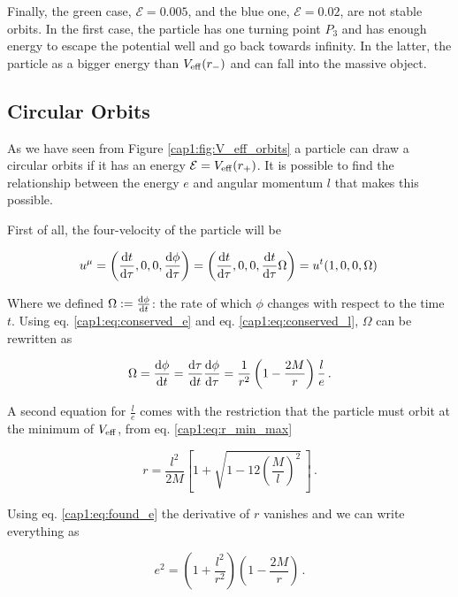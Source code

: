 Finally, the green case, $\mathcal E = 0.005$, and the blue one,
$\mathcal E = 0.02$, are not stable orbits.
In the first case, the particle has one turning point $P_3$ and has enough
energy to escape the potential well and go back towards infinity.
In the latter, the particle as a bigger energy than $V_{\rm eff} (r_-)$
and can fall into the massive object.


\subsection{Circular Orbits}
\label{cap1:ssec:circular_orbits}

As we have seen from Figure \ref{cap1:fig:V_eff_orbits} a particle can draw a
circular orbits if it has an energy $\mathcal E = V_{\rm eff}(r_+)$.
It is possible to find the relationship between the energy $e$
and angular momentum $l$ that makes this possible.

First of all, the four-velocity of the particle will be

\begin{equation}
    u^\mu = \left(\dv{t}{\tau}, 0, 0, \dv{\phi}{\tau} \right)
    = \left(\dv{t}{\tau}, 0, 0, \dv{t}{\tau} \Omega \right)
    = u^t (1, 0, 0, \Omega) \,
    \label{cap1:eq:circular_orbit_u}
\end{equation}

Where we defined $\Omega := \dv{\phi}{t}$: the rate of which $\phi$ changes with
respect to the \Sh time $t$.
Using eq. \ref{cap1:eq:conserved_e} and eq. \ref{cap1:eq:conserved_l}, $\Omega$
can be rewritten as

\begin{equation}
    \Omega = \dv{\phi}{t} = \dv{\tau}{t} \dv{\phi}{\tau} =
    \frac{1}{r^2} \left(1 - \frac{2M}{r} \right) \frac{l}{e}\, .
    \label{cap1:eq:Omega}
\end{equation}

A second equation for $\frac{l}{e}$ comes with the restriction that the
particle must orbit at the minimum of $V_{\rm eff}$, from eq.
\ref{cap1:eq:r_min_max}

\begin{equation}
    r = \frac{l^2}{2 M} \left[1 +
    \sqrt{1 - 12 \left( \frac{M}{l} \right)^2} \, \right] \, .
    \label{cap1:eq:r_min}
\end{equation}

Using eq. \ref{cap1:eq:found_e} the derivative of $r$ vanishes
and we can write everything as

\begin{equation}
    e^2 = \left(1 + \frac{l^2}{r^2} \right)
    \left(1 - \frac{2M}{r}\right) \, .
    \label{cap1:eq:circular_orbit1}
\end{equation}

